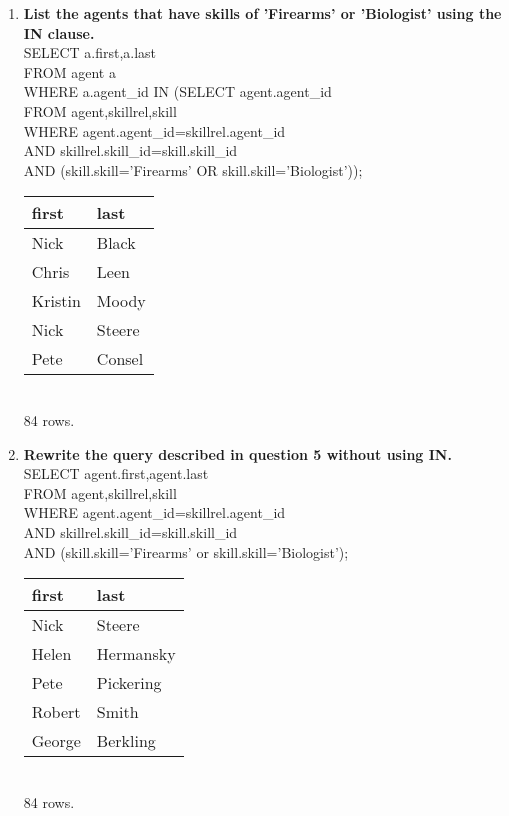 \documentclass{article}
\begin{document}
\begin{enumerate}
\item
\textbf{List the agents that have skills of 'Firearms' or 'Biologist' using the IN clause.\\}
SELECT a.first,a.last\\
FROM agent a\\
WHERE a.agent\_id IN (SELECT agent.agent\_id\\
\hspace*{4 cm}       FROM agent,skillrel,skill\\
\hspace*{4 cm}       WHERE agent.agent\_id=skillrel.agent\_id\\
\hspace*{4 cm}       AND skillrel.skill\_id=skill.skill\_id\\
\hspace*{4 cm}       AND (skill.skill='Firearms' OR skill.skill='Biologist'));\\
\begin{tabular}{l|l}
first     &    last     \\
\hline
 Nick         & Black\\
 Chris        & Leen\\
 Kristin      & Moody\\
 Nick         & Steere\\
 Pete         & Consel\\
\end{tabular}
\\84 rows.\\

\item
\textbf{Rewrite the query described in question 5 without using IN.\\}
SELECT agent.first,agent.last\\
FROM agent,skillrel,skill\\
WHERE agent.agent\_id=skillrel.agent\_id\\
AND skillrel.skill\_id=skill.skill\_id\\
AND (skill.skill='Firearms' or skill.skill='Biologist');\\
\begin{tabular}{l|l}
first     &    last     \\
\hline
 Nick         & Steere\\
 Helen        & Hermansky\\
 Pete         & Pickering\\
 Robert       & Smith\\
 George       & Berkling\\
\end{tabular}
\\84 rows.\\


\end{enumerate}
\end{document}
